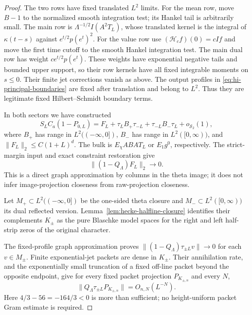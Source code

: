 \begin{proof}
The two rows have fixed translated $L^2$ limits. For the mean row, move
$B-1$ to the normalized smooth integration test; its Hankel tail is
arbitrarily small. The main row is
$\Lambda^{-1/2}I(A^2T_L)$, whose translated kernel is the integral of
$\kappa(t-s)$ against $e^{t/2}p(e^t)^2$. For the value row use
$(\mathcal H_cf)(0)=cIf$ and move the first time cutoff to the smooth
Hankel integration test. The main dual row has weight
$c e^{t/2}p(e^t)$. These weights have exponential negative tails and
bounded upper support, so their row kernels have all fixed integrable
moments on $s\le0$. Their finite jet corrections vanish as above.
The output profiles in \eqref{eq:hi-principal-boundaries} are fixed after
translation and belong to $L^2$. Thus they are legitimate fixed
Hilbert--Schmidt boundary terms.

In both sectors we have constructed
\begin{equation}\label{eq:hi-endpoint-decomposition}
 S_LC_a(1-P_{0,L})
   =F_L+\tau_LB_+\tau_{-L}
          +\tau_{-L}B_-\tau_L+o_{\mathcal S_2}(1),
\end{equation}
where $B_+$ has range in $L^2(( -\infty,0])$, $B_-$ has range in
$L^2([0,\infty))$, and $\|F_L\|_2\le C(1+L)^d$.
The bulk is $E_\chi ABA T_L$ or $E_1g^0$, respectively.
The strict-margin input and exact constraint restoration give
\begin{equation}\label{eq:hi-bulk-distance}
                         \|(1-Q_\Lambda)F_L\|_2\longrightarrow0.
\end{equation}
This is a direct graph approximation by columns in the theta image;
it does not infer image-projection closeness from raw-projection closeness.

Let $M_+\subset L^2(( -\infty,0])$ be the one-sided theta closure and
$M_-\subset L^2([0,\infty))$ its dual reflected version.
Lemma~\ref{lem:hecke-halfline-closure} identifies their complements
$K_\pm$ as the pure Blaschke model spaces for the right and left
half-strip zeros of the original character.

The fixed-profile graph approximation proves
$\|(1-Q_\Lambda)\tau_{\pm L}v\|\to0$ for each $v\in M_\pm$.
Finite exponential-jet packets are dense in $K_\pm$. Their annihilation rate, and the exponentially small truncation of a fixed
off-line packet beyond the opposite endpoint, give for every fixed
packet projection $P_{K_{\pm,n}}$ and every $N$,
\[
 \|Q_\Lambda\tau_{\pm L}P_{K_{\pm,n}}\|
                                      =O_{n,N}(L^{-N}).
\]
Here $4/3-56=-164/3<0$ is more than sufficient; no height-uniform
packet Gram estimate is required.


\end{proof}
